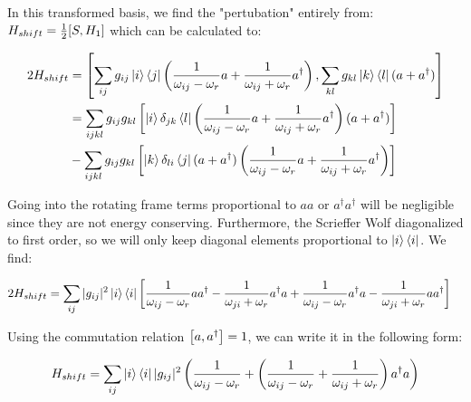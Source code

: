 In this transformed basis, we find the "pertubation" entirely from: $H_{shift} = \frac12 \comm{S}{H_1}$ which can be calculated to:
\begin{fullwidth}
\begin{align*}
    2 H_{shift}&= \comm{\sum_{ij}g_{ij}\ket{i}\bra{j}\left(\frac{1}{\omega_{ij} - \omega_r}a + \frac{1}{\omega_{ij} + \omega_r} a^\dagger \right)}{\sum_{kl} g_{kl} \ket{k}\bra{l} (a + a^\dagger ) } \\
    &= \sum_{ijkl} g_{ij} g_{kl}\left[\ket{i}\delta_{jk}\bra{l}\left(\frac{1}{\omega_{ij} - \omega_r}a + \frac{1}{\omega_{ij} + \omega_r} a^\dagger \right)(a + a^\dagger)\right]\\
    &- \sum_{ijkl} g_{ij} g_{kl}\left[\ket{k} \delta_{li}\bra{j} (a + a^\dagger)\left(\frac{1}{\omega_{ij} - \omega_r}a + \frac{1}{\omega_{ij} + \omega_r} a^\dagger\right)\right]
\end{align*}
\end{fullwidth}
Going into the rotating frame terms proportional to $aa$ or $a^\dagger a^\dagger$ will be negligible since they are not energy conserving. Furthermore, the Scrieffer Wolf diagonalized to first order, so we will only keep diagonal elements proportional to $\ket{i}\bra{i}$. We find:
\begin{fullwidth}
\begin{align*}
    2 H_{shift} &= \sum_{ij} |g_{ij}|^2 \ket{i}\bra{i} \left[\frac{1}{\omega_{ij} - \omega_r}aa^\dagger - \frac{1}{\omega_{ji} + \omega_r} a^\dagger a + \frac{1}{\omega_{ij} - \omega_r}a^\dagger a - \frac{1}{\omega_{ji} + \omega_r}  a a^\dagger  \right]
\end{align*}
\end{fullwidth}

Using the commutation relation $\comm{a}{a^\dagger} = 1$, we can write it in the following form:
\begin{fullwidth}
\begin{equation}
    H_{shift} = \sum_{ij} \ket{i}\bra{i} |g_{ij}|^2 \left(\frac{1}{\omega_{ij} - \omega_r} + \left(\frac{1}{\omega_{ij} - \omega_r} + \frac{1}{\omega_{ij} + \omega_r} \right)a^\dagger a\right)
\end{equation}
\end{fullwidth}

